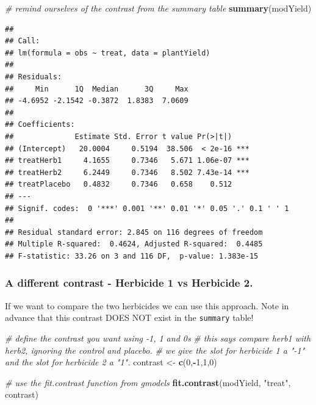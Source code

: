 \documentclass[
]{book}
\newenvironment{Shaded}{\begin{snugshade}}{\end{snugshade}}
\newcommand{\CommentTok}[1]{\textcolor[rgb]{0.56,0.35,0.01}{\textit{#1}}}
\newcommand{\DecValTok}[1]{\textcolor[rgb]{0.00,0.00,0.81}{#1}}
\newcommand{\FunctionTok}[1]{\textcolor[rgb]{0.13,0.29,0.53}{\textbf{#1}}}
\newcommand{\NormalTok}[1]{#1}
\newcommand{\OtherTok}[1]{\textcolor[rgb]{0.56,0.35,0.01}{#1}}
\newcommand{\SpecialCharTok}[1]{\textcolor[rgb]{0.81,0.36,0.00}{\textbf{#1}}}
\newcommand{\StringTok}[1]{\textcolor[rgb]{0.31,0.60,0.02}{#1}}
\begin{document}
\begin{Shaded}
\begin{Highlighting}[]
\CommentTok{\# remind ourselves of the contrast from the summary table}
\FunctionTok{summary}\NormalTok{(modYield)}
\end{Highlighting}
\end{Shaded}

\begin{verbatim}
## 
## Call:
## lm(formula = obs ~ treat, data = plantYield)
## 
## Residuals:
##     Min      1Q  Median      3Q     Max 
## -4.6952 -2.1542 -0.3872  1.8383  7.0609 
## 
## Coefficients:
##              Estimate Std. Error t value Pr(>|t|)    
## (Intercept)   20.0004     0.5194  38.506  < 2e-16 ***
## treatHerb1     4.1655     0.7346   5.671 1.06e-07 ***
## treatHerb2     6.2449     0.7346   8.502 7.43e-14 ***
## treatPlacebo   0.4832     0.7346   0.658    0.512    
## ---
## Signif. codes:  0 '***' 0.001 '**' 0.01 '*' 0.05 '.' 0.1 ' ' 1
## 
## Residual standard error: 2.845 on 116 degrees of freedom
## Multiple R-squared:  0.4624, Adjusted R-squared:  0.4485 
## F-statistic: 33.26 on 3 and 116 DF,  p-value: 1.383e-15
\end{verbatim}

\subsubsection{A different contrast - Herbicide 1 vs Herbicide 2.}\label{a-different-contrast---herbicide-1-vs-herbicide-2.}

If we want to compare the two herbicides we can use this approach. Note in advance that this contrast DOES NOT exist in the \texttt{summary} table!

\begin{Shaded}
\begin{Highlighting}[]
\CommentTok{\# define the contrast you want using {-}1, 1 and 0\textquotesingle{}s}
\CommentTok{\# this says compare herb1 with herb2, ignoring the control and placebo.}
\CommentTok{\# we give the slot for herbicide 1 a "{-}1" and the slot for herbicide 2 a "1".}
\NormalTok{contrast }\OtherTok{\textless{}{-}} \FunctionTok{c}\NormalTok{(}\DecValTok{0}\NormalTok{,}\SpecialCharTok{{-}}\DecValTok{1}\NormalTok{,}\DecValTok{1}\NormalTok{,}\DecValTok{0}\NormalTok{)}

\CommentTok{\# use the fit.contrast function from gmodels}
\FunctionTok{fit.contrast}\NormalTok{(modYield, }\StringTok{"treat"}\NormalTok{, contrast)}
\end{Highlighting}
\end{Shaded}
\end{document}
